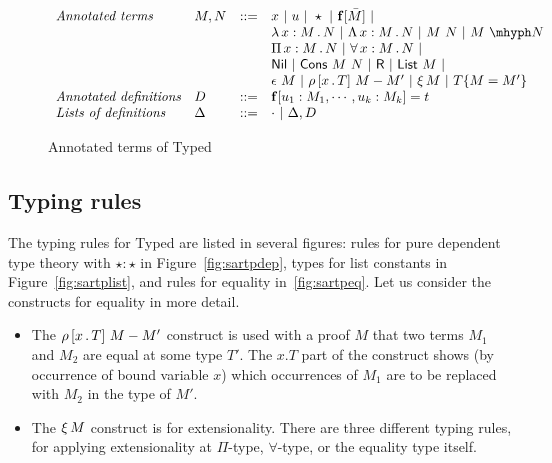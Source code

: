 \documentclass{article}
\begin{document}
\begin{figure}
  \[
  \begin{array}{llll}
    \textit{Annotated terms} & M, N & ::= &
    x\ |\ u\ |\ \star\ |\ \mathbf{f}[\bar{M}]\ |\\
    \ &\ &\ & \tlam{x}{M}{N}\ |\ \Tlam{x}{M}{N}\ |\ M\ N\ |\ \appe{M}{N}\\
    \ &\ &\ & \Pia{x}{M}{N}\ |\ \allt{x}{M}{N}\ |\\    
    \ &\ &\ & \mathsf{Nil}\ |\ \mathsf{Cons}\ M\ N\ |\ \mathsf{R}\ |\ \mathsf{List}\ M\ |\\
    \ &\ &\ & \rfl{M}\ |\ \cng{x}{T}{M}{M'}\ |\ \ext{M}\ |\ \eqtm{M}{T}{M'} \\
    \textit{Annotated definitions} & D & ::= & \mathbf{f}[u_1:M_1,\cdots,u_k:M_k] = t \\
    \textit{Lists of definitions} & \Delta & ::= & \cdot \ |\ \Delta, D
  \end{array}
  \]
  \caption{Annotated terms of Typed \sar}
  \label{fig:annotm}
\end{figure}

\subsection{Typing rules}

The typing rules for Typed \sar are listed in several figures: rules for pure dependent type theory
with $\star : \star$ in Figure~\ref{fig:sartpdep}, types for list constants in Figure~\ref{fig:sartplist},
and rules for equality in~\ref{fig:sartpeq}.  Let us consider the constructs for equality in more detail.

\begin{itemize}
\item The $\rho\, [x\,.\,T]\ M - M'$ construct is used with a proof $M$ that two terms $M_1$ and $M_2$ are
  equal at some type $T'$.  The $x.T$ part of the construct shows (by occurrence of bound variable $x$)
  which occurrences of $M_1$ are to
  be replaced with $M_2$ in the type of $M'$.
\item The $\xi\, M$ construct is for extensionality.  There are three different typing rules,
  for applying extensionality at $\Pi$-type, $\forall$-type, or the equality type itself.
\end{itemize}
\end{document}
